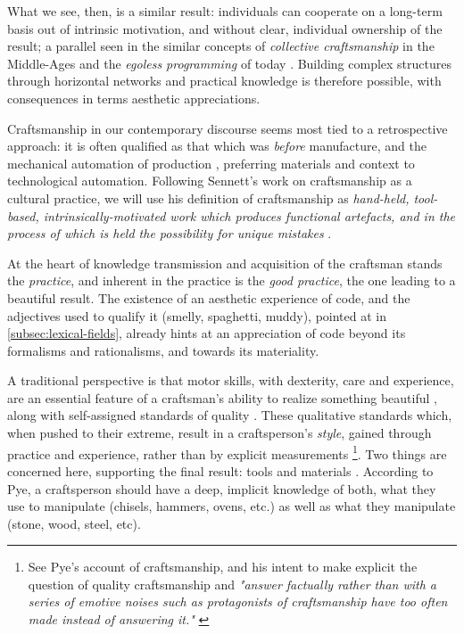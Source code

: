 What we see, then, is a similar result: individuals can cooperate on a long-term basis out of intrinsic motivation, and without clear, individual ownership of the result; a parallel seen in the similar concepts of \emph{collective craftsmanship} in the Middle-Ages and the \emph{egoless programming} of today \citep{brooksjr_mythical_1975}. Building complex structures through horizontal networks and practical knowledge is therefore possible, with consequences in terms aesthetic appreciations.

Craftsmanship in our contemporary discourse seems most tied to a retrospective approach: it is often qualified as that which was \emph{before} manufacture, and the mechanical automation of production \citep{thompson_study_1934}, preferring materials and context to technological automation. Following Sennett's work on craftsmanship as a cultural practice, we will use his definition of craftsmanship as \emph{hand-held, tool-based, intrinsically-motivated work which produces functional artefacts, and in the process of which is held the possibility for unique mistakes} \citep{sennett_craftsman_2009}.

At the heart of knowledge transmission and acquisition of the craftsman stands the \emph{practice}, and inherent in the practice is the \emph{good practice}, the one leading to a beautiful result. The existence of an aesthetic experience of code, and the adjectives used to qualify it (smelly, spaghetti, muddy), pointed at in \autoref{subsec:lexical-fields}, already hints at an appreciation of code beyond its formalisms and rationalisms, and towards its materiality.

A traditional perspective is that motor skills, with dexterity, care and experience, are an essential feature of a craftsman's ability to realize something beautiful \citep{osborne_aesthetic_1977}, along with self-assigned standards of quality \citep{pye_nature_2008,sennett_craftsman_2009}. These qualitative standards which, when pushed to their extreme, result in a craftsperson's \emph{style}, gained through practice and experience, rather than by explicit measurements \citep{pye_nature_2008} \footnote{See Pye's account of craftsmanship, and his intent to make explicit the question of quality craftsmanship and \emph{"answer factually rather than with a series of emotive noises such as protagonists of craftsmanship have too often made instead of answering it."} \citep{pye_nature_2008}}. Two things are concerned here, supporting the final result: tools and materials \citep{pye_nature_2008}. According to Pye, a craftsperson should have a deep, implicit knowledge of both, what they use to manipulate (chisels, hammers, ovens, etc.) as well as what they manipulate (stone, wood, steel, etc).

